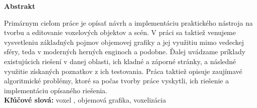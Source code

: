 \begin{Huge}
\textbf{Abstrakt}  \\
\end{Huge}

Primárnym cieľom práce je opísať návrh a implementáciu praktického nástroja na tvorbu 
a editovanie voxelových objektov a scén. 
V práci sa taktiež venujeme vysvetleniu základných pojmov objemovej grafiky a jej využitiu mimo vedeckej sféry, teda v moderných herných enginoch a podobne.
Ďalej uvádzame príklady existujúcich riešení v danej oblasti, ich kladné a záporné stránky, a následné
využitie získaných poznatkov z ich testovania.
Práca taktiež opisuje zaujímavé algoritmické problémy, ktoré sa počas tvorby práce vyskytli, ich riešenie a implementáciu opísaného riešenia.\\



\textbf{Kľúčové slová:} voxel , objemová grafika, voxelizácia